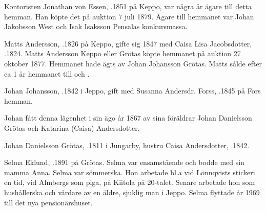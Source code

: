 Kontoristen Jonathan von Essen, .1851 på Keppo, var några år ägare till detta hemman. Han köpte det på auktion 7 juli 1879. Ägare till hemmanet var Johan Jakobsson West och Isak Isaksson Pensalas konkursmassa.


Matts Andersson, .1826 på Keppo, gifte sig 1847 med Caisa Lisa Jacobsdotter, .1824. Matts Andersson Keppo eller Grötas köpte hemmanet på auktion 27 oktober 1877. Hemmanet hade ägts av Johan Johansson Grötas. Matts sålde efter ca 1 år hemmanet till  och .


Johan Johansson, .1842 i Jeppo, gift med Susanna Andersdr. Forss, .1845 på Fors hemman.
\begin{jhchildren}
  \item {}
  \item {}
  \item {}
  \item {}
  \item {}
  \item {}
\end{jhchildren}

Johan fått denna lägenhet i sin ägo år 1867 av sina föräldrar Johan	Danielsson Grötas och Katarina (Caisa) Andersdotter.


Johan Danielsson Grötas, .1811 i Jungarby, hustru Caisa Andersdotter, .1842.





Selma Eklund, .1891 på Grötas. Selma var ensamstående och bodde med sin mamma Anna. Selma var sömmerska. Hon arbetade bl.a vid Lönnqvists stickeri en tid, vid Almbergs som piga, på Kiitola på 20-talet. Senare arbetade hon som hushållerska och vårdare av en äldre, sjuklig man i Jeppo. Selma flyttade år 1969 till det nya pensionärshuset.

